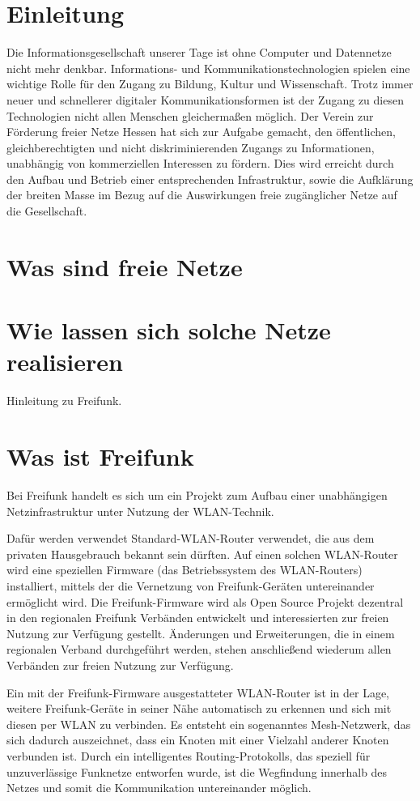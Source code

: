 \documentclass[ngerman]{article}
\begin{document}
\section*{Einleitung}
Die Informationsgesellschaft unserer Tage ist ohne Computer und Datennetze nicht mehr denkbar.
In\-for\-ma\-tions- und Kommunikationstechnologien spielen eine wichtige Rolle für den Zugang zu Bildung, Kultur und Wissenschaft.
Trotz immer neuer und schnellerer digitaler Kommunikationsformen ist der Zugang zu diesen Technologien nicht allen Menschen gleichermaßen möglich.
Der Verein zur Förderung freier Netze Hessen hat sich zur Aufgabe gemacht, den öffentlichen, gleichberechtigten und nicht diskriminierenden Zugangs zu Informationen, unabhängig von kommerziellen Interessen zu fördern.
Dies wird erreicht durch den Aufbau und Betrieb einer entsprechenden Infrastruktur, sowie die Aufklärung der breiten Masse im Bezug auf die Auswirkungen freie zugänglicher Netze auf die Gesellschaft.

\section*{Was sind freie Netze}

\section*{Wie lassen sich solche Netze realisieren}
Hinleitung zu Freifunk.

\section*{Was ist Freifunk}
Bei Freifunk handelt es sich um ein Projekt zum Aufbau einer unabhängigen Netzinfrastruktur unter Nutzung der WLAN-Technik.

Dafür werden verwendet Standard-WLAN-Router verwendet, die aus dem privaten Hausgebrauch bekannt sein dürften. 
Auf einen solchen WLAN-Router wird eine speziellen Firmware (das Betriebssystem des WLAN-Routers) installiert, mittels der die Vernetzung von Freifunk-Geräten untereinander ermöglicht wird.
Die Freifunk-Firmware wird als Open Source Projekt dezentral in den regionalen Freifunk Verbänden entwickelt und interessierten zur freien Nutzung zur Verfügung gestellt.
Änderungen und Erweiterungen, die in einem regionalen Verband durchgeführt werden, stehen anschließend wiederum allen Verbänden zur freien Nutzung zur Verfügung.
   
Ein mit der Freifunk-Firmware ausgestatteter WLAN-Router ist in der Lage, weitere Freifunk-Geräte in seiner Nähe automatisch zu erkennen und sich mit diesen per WLAN zu verbinden. 
Es entsteht ein sogenanntes Mesh-Netzwerk, das sich dadurch auszeichnet, dass ein Knoten mit einer Vielzahl anderer Knoten verbunden ist.
Durch ein intelligentes Routing-Protokolls, das speziell für unzuverlässige Funknetze entworfen wurde, ist die Wegfindung innerhalb des Netzes und somit die Kommunikation untereinander möglich.
\end{document}
